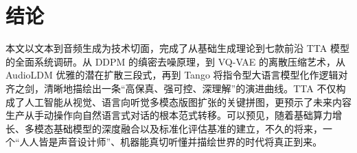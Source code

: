 \documentclass[12pt,a4paper]{article}
\begin{document}
\section{结论}

本文以文本到音频生成为技术切面，完成了从基础生成理论到七款前沿 TTA 模型的全面系统调研。从 DDPM 的缜密去噪原理，到 VQ-VAE 的离散压缩艺术，从 AudioLDM 优雅的潜在扩散三段式，再到 Tango 将指令型大语言模型化作逻辑对齐之剑，清晰地描绘出一条“高保真、强可控、深理解”的演进曲线。TTA 不仅构成了人工智能从视觉、语言向听觉多模态版图扩张的关键拼图，更预示了未来内容生产从手动操作向自然语言式对话的根本范式转移。可以预见，随着基础算力增长、多模态基础模型的深度融合以及标准化评估基准的建立，不久的将来，一个“人人皆是声音设计师”、机器能真切听懂并描绘世界的时代将真正到来。
\end{document}

